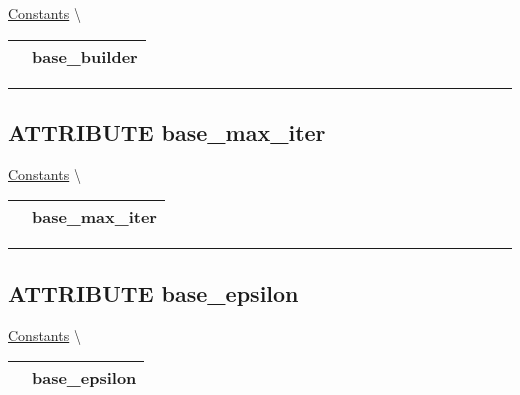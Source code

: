 \hypertarget{ecldoc:logisticregression.constants.base_builder}{}
\hspace{0pt} \hyperlink{ecldoc:LogisticRegression.Constants}{Constants} \textbackslash 

{\renewcommand{\arraystretch}{1.5}
\begin{tabularx}{\textwidth}{|>{\raggedright\arraybackslash}l|X|}
\hline
\hspace{0pt}\mytexttt{\color{red} } & \textbf{base\_builder} \\
\hline
\end{tabularx}
}

\par


\rule{\linewidth}{0.5pt}
\subsection*{\textsf{\colorbox{headtoc}{\color{white} ATTRIBUTE}
base\_max\_iter}}

\hypertarget{ecldoc:logisticregression.constants.base_max_iter}{}
\hspace{0pt} \hyperlink{ecldoc:LogisticRegression.Constants}{Constants} \textbackslash 

{\renewcommand{\arraystretch}{1.5}
\begin{tabularx}{\textwidth}{|>{\raggedright\arraybackslash}l|X|}
\hline
\hspace{0pt}\mytexttt{\color{red} } & \textbf{base\_max\_iter} \\
\hline
\end{tabularx}
}

\par


\rule{\linewidth}{0.5pt}
\subsection*{\textsf{\colorbox{headtoc}{\color{white} ATTRIBUTE}
base\_epsilon}}

\hypertarget{ecldoc:logisticregression.constants.base_epsilon}{}
\hspace{0pt} \hyperlink{ecldoc:LogisticRegression.Constants}{Constants} \textbackslash 

{\renewcommand{\arraystretch}{1.5}
\begin{tabularx}{\textwidth}{|>{\raggedright\arraybackslash}l|X|}
\hline
\hspace{0pt}\mytexttt{\color{red} } & \textbf{base\_epsilon} \\
\hline
\end{tabularx}
}

